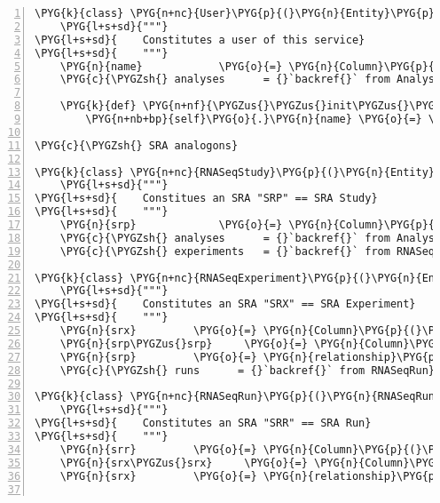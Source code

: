 \begin{Verbatim}[commandchars=\\\{\},numbers=left,firstnumber=1,stepnumber=5]
\PYG{k}{class} \PYG{n+nc}{User}\PYG{p}{(}\PYG{n}{Entity}\PYG{p}{)}\PYG{p}{:}
    \PYG{l+s+sd}{"""}
\PYG{l+s+sd}{    Constitutes a user of this service}
\PYG{l+s+sd}{    """}
    \PYG{n}{name}            \PYG{o}{=} \PYG{n}{Column}\PYG{p}{(}\PYG{n}{String}\PYG{p}{,} \PYG{n}{primary\PYGZus{}key}\PYG{o}{=}\PYG{n+nb+bp}{True}\PYG{p}{)}
    \PYG{c}{\PYGZsh{} analyses      = {}`backref{}` from Analysis}

    \PYG{k}{def} \PYG{n+nf}{\PYGZus{}\PYGZus{}init\PYGZus{}\PYGZus{}}\PYG{p}{(}\PYG{n+nb+bp}{self}\PYG{p}{,} \PYG{n}{name}\PYG{p}{)}\PYG{p}{:}
        \PYG{n+nb+bp}{self}\PYG{o}{.}\PYG{n}{name} \PYG{o}{=} \PYG{n}{name}

\PYG{c}{\PYGZsh{} SRA analogons}

\PYG{k}{class} \PYG{n+nc}{RNASeqStudy}\PYG{p}{(}\PYG{n}{Entity}\PYG{p}{)}\PYG{p}{:} \PYG{c}{\PYGZsh{} stub}
    \PYG{l+s+sd}{"""}
\PYG{l+s+sd}{    Constitues an SRA "SRP" == SRA Study}
\PYG{l+s+sd}{    """}
    \PYG{n}{srp}             \PYG{o}{=} \PYG{n}{Column}\PYG{p}{(}\PYG{n}{String}\PYG{p}{,} \PYG{n}{primary\PYGZus{}key}\PYG{o}{=}\PYG{n+nb+bp}{True}\PYG{p}{)}
    \PYG{c}{\PYGZsh{} analyses      = {}`backref{}` from Analysis}
    \PYG{c}{\PYGZsh{} experiments   = {}`backref{}` from RNASeqExperiment}

\PYG{k}{class} \PYG{n+nc}{RNASeqExperiment}\PYG{p}{(}\PYG{n}{Entity}\PYG{p}{)}\PYG{p}{:} \PYG{c}{\PYGZsh{} stub}
    \PYG{l+s+sd}{"""}
\PYG{l+s+sd}{    Constitutes an SRA "SRX" == SRA Experiment}
\PYG{l+s+sd}{    """}
    \PYG{n}{srx}         \PYG{o}{=} \PYG{n}{Column}\PYG{p}{(}\PYG{n}{String}\PYG{p}{,} \PYG{n}{primary\PYGZus{}key}\PYG{o}{=}\PYG{n+nb+bp}{True}\PYG{p}{)}
    \PYG{n}{srp\PYGZus{}srp}     \PYG{o}{=} \PYG{n}{Column}\PYG{p}{(}\PYG{n}{Integer}\PYG{p}{,} \PYG{n}{ForeignKey}\PYG{p}{(}\PYG{n}{RNASeqStudy}\PYG{o}{.}\PYG{n}{srp}\PYG{p}{)}\PYG{p}{)}
    \PYG{n}{srp}         \PYG{o}{=} \PYG{n}{relationship}\PYG{p}{(}\PYG{n}{RNASeqStudy}\PYG{p}{,} \PYG{n}{backref}\PYG{o}{=}\PYG{n}{backref}\PYG{p}{(}\PYG{l+s}{"}\PYG{l+s}{experiments}\PYG{l+s}{"}\PYG{p}{)}\PYG{p}{)}
    \PYG{c}{\PYGZsh{} runs      = {}`backref{}` from RNASeqRun}

\PYG{k}{class} \PYG{n+nc}{RNASeqRun}\PYG{p}{(}\PYG{n}{RNASeqRunMixins}\PYG{p}{,} \PYG{n}{Entity}\PYG{p}{)}\PYG{p}{:}
    \PYG{l+s+sd}{"""}
\PYG{l+s+sd}{    Constitutes an SRA "SRR" == SRA Run}
\PYG{l+s+sd}{    """}
    \PYG{n}{srr}         \PYG{o}{=} \PYG{n}{Column}\PYG{p}{(}\PYG{n}{String}\PYG{p}{,} \PYG{n}{primary\PYGZus{}key}\PYG{o}{=}\PYG{n+nb+bp}{True}\PYG{p}{)}
    \PYG{n}{srx\PYGZus{}srx}     \PYG{o}{=} \PYG{n}{Column}\PYG{p}{(}\PYG{n}{Integer}\PYG{p}{,} \PYG{n}{ForeignKey}\PYG{p}{(}\PYG{l+s}{'}\PYG{l+s}{rnaseqexperiment.srx}\PYG{l+s}{'}\PYG{p}{)}\PYG{p}{)}
    \PYG{n}{srx}         \PYG{o}{=} \PYG{n}{relationship}\PYG{p}{(}\PYG{n}{RNASeqExperiment}\PYG{p}{,} \PYG{n}{backref}\PYG{o}{=}\PYG{n}{backref}\PYG{p}{(}\PYG{l+s}{"}\PYG{l+s}{runs}\PYG{l+s}{"}\PYG{p}{)}\PYG{p}{)}


\end{Verbatim}
